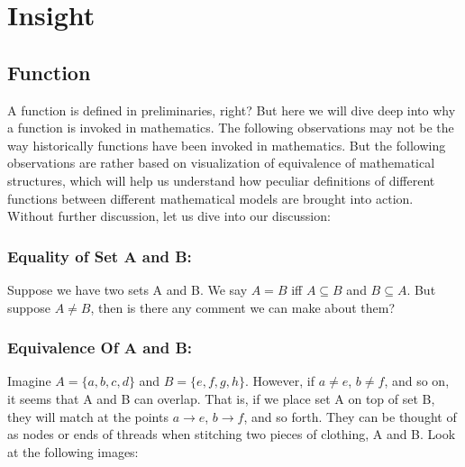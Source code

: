 \documentclass{article}
\begin{document}
\section{Insight}
\subsection{Function}
A function is defined in preliminaries, right? But here we will dive deep into why a function is invoked in mathematics. The following observations may not be the way historically functions have been invoked in mathematics. But the following observations are rather based on visualization of equivalence of mathematical structures, which will help us understand how peculiar definitions of different functions between different mathematical models are brought into action. Without further discussion, let us dive into our discussion:

\subsubsection{Equality of Set A and B:}
Suppose we have two sets A and B. We say $A=B$ iff $A\subseteq B$ and $B\subseteq A$. But suppose $A\neq B$, then is there any comment we can make about them?

\subsubsection{Equivalence Of A and B:}
Imagine $A = \{a, b, c, d\}$ and $B = \{e, f, g, h\}$. However, if $a \neq e$, $b \neq f$, and so on, it seems that A and B can overlap. That is, if we place set A on top of set B, they will match at the points $a \rightarrow e$, $b \rightarrow f$, and so forth. They can be thought of as nodes or ends of threads when stitching two pieces of clothing, A and B. Look at the following images:

\begin{center}
\end{center}
\end{document}
